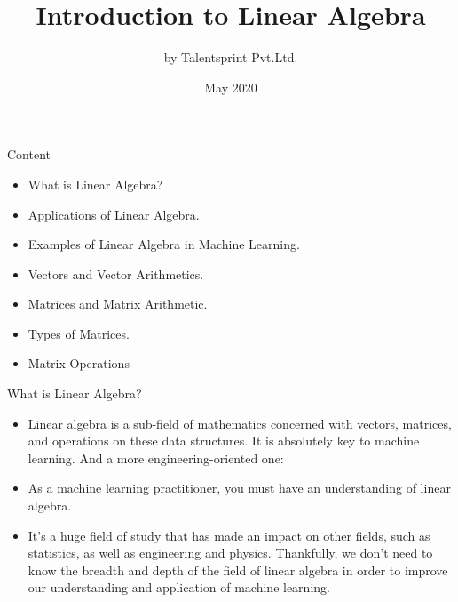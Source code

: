 \documentclass{beamer}
\title{Introduction to Linear Algebra}
\author{by Talentsprint Pvt.Ltd.}
\date{May 2020}
\begin{document}
\maketitle
\begin{frame}{Content}
	\begin{itemize}
		\item What is Linear Algebra? 
		\item Applications of Linear Algebra.
		\item Examples of Linear Algebra in Machine Learning.
		\item Vectors and Vector Arithmetics.
		\item Matrices and Matrix Arithmetic.
		\item Types of Matrices.
		\item Matrix Operations
	\end{itemize}
\end{frame}
\begin{frame}{What is Linear Algebra?}
\begin{itemize}
    \item Linear algebra is a sub-field of mathematics concerned with vectors, matrices, and operations on these data structures. It is absolutely key to machine learning.
\vspace{10pt}
And a more engineering-oriented one:
    \item As a machine learning practitioner, you must have an understanding of linear algebra.\\
\vspace{10pt}
    \item It’s a huge field of study that has made an impact on other fields, such as statistics, as well as engineering and physics. Thankfully, we don’t need to know the breadth and depth of the field of linear algebra in order to improve our understanding and application of machine learning.\\\
\end{itemize}
\end{frame}
\end{document}
